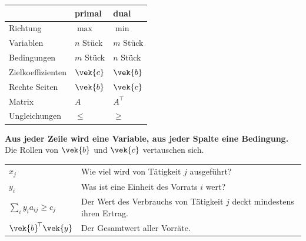 \begin{merksatz}
\begin{center}
{\small
\renewcommand{\arraystretch}{1.52}
\begin{tabular}{@{}P{2.6cm}P{2.8cm}P{2.8cm}@{}}
\toprule
& \textbf{primal} & \textbf{dual}\\
\midrule
Richtung & $\max$ & $\min$\\
Variablen & $n$ Stück & $m$ Stück\\
Bedingungen & $m$ Stück & $n$ Stück\\
Zielkoeffizienten & $\vek{c}$ & $\vek{b}$\\
Rechte Seiten & $\vek{b}$ & $\vek{c}$\\
Matrix & $A$ & $A^{\!\top}$\\
Ungleichungen & $\le$ & $\ge$\\
\bottomrule
\end{tabular}}
\end{center}

\begin{center}
\begin{minipage}{0.9\textwidth}
\textbf{Aus jeder Zeile wird eine Variable, aus jeder Spalte eine Bedingung.} Die Rollen von $\vek{b}$ und $\vek{c}$ vertauschen sich.
\end{minipage}
\end{center}

\begin{center}
\renewcommand{\arraystretch}{1.5}
\begin{tabular}{@{}P{2.4cm}P{6.2cm}@{}}
\toprule
$x_j$ & Wie viel wird von Tätigkeit $j$ ausgeführt?\\
$y_i$ & Was ist eine Einheit des Vorrats $i$ wert?\\
$\sum_i y_ia_{ij} \ge c_j$ & Der Wert des Verbrauchs von Tätigkeit $j$ deckt mindestens ihren Ertrag.\\
$\vek{b}^{\!\top}\vek{y}$ & Der Gesamtwert aller Vorräte.\\
\bottomrule
\end{tabular}
\end{center}

\begin{center}
\begin{minipage}{0.88\textwidth}
\end{minipage}
\end{center}
\end{merksatz}

